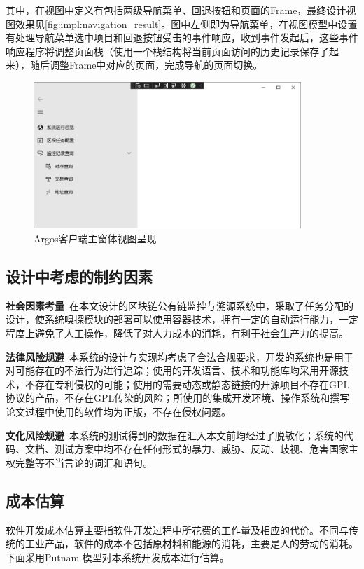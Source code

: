 \documentclass[supercite]{HustGraduPaper}
\newcommand{\xfig}[3]{
  \begin{figure}[htb]
    \centering
    #3
    \caption{#2}
    \label{fig:#1}
  \end{figure}
}
\newcommand{\rfig}[1]{\autoref{fig:#1}}
\theoremstyle{definition}
\begin{document}
其中，在视图中定义有包括两级导航菜单、回退按钮和页面的Frame，最终设计视图效果见\rfig{impl:navigation_result}。图中左侧即为导航菜单，在视图模型中设置有处理导航菜单选中项目和回退按钮受击的事件响应，收到事件发起后，这些事件响应程序将调整页面栈（使用一个栈结构将当前页面访问的历史记录保存了起来），随后调整Frame中对应的页面，完成导航的页面切换。

\xfig{impl:navigation_result}{Argos客户端主窗体视图呈现}{
  \includegraphics[width=0.9\textwidth]{images/4.4-navigation-result.png}
}
\subsection{设计中考虑的制约因素}
\textbf{社会因素考量}\ 在本文设计的区块链公有链监控与溯源系统中，采取了任务分配的设计，使系统嗅探模块的部署可以使用容器技术，拥有一定的自动运行能力，一定程度上避免了人工操作，降低了对人力成本的消耗，有利于社会生产力的提高。

\textbf{法律风险规避}\ 本系统的设计与实现均考虑了合法合规要求，开发的系统也是用于对可能存在的不法行为进行追踪；使用的开发语言、技术和功能库均采用开源技术，不存在专利侵权的可能；使用的需要动态或静态链接的开源项目不存在GPL协议的产品，不存在GPL传染的风险；所使用的集成开发环境、操作系统和撰写论文过程中使用的软件均为正版，不存在侵权问题。

\textbf{文化风险规避}\ 本系统的测试得到的数据在汇入本文前均经过了脱敏化；系统的代码、文档、测试方案中均不存在任何形式的暴力、威胁、反动、歧视、危害国家主权完整等不当言论的词汇和语句。

\subsection{成本估算}
软件开发成本估算主要指软件开发过程中所花费的工作量及相应的代价。不同与传统的工业产品，软件的成本不包括原材料和能源的消耗，主要是人的劳动的消耗。下面采用Putnam 模型对本系统开发成本进行估算。
\end{document}
